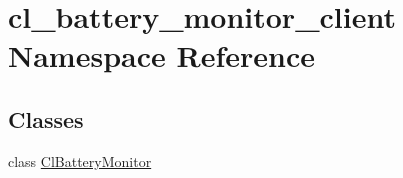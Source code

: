 \hypertarget{namespacecl__battery__monitor__client}{}\section{cl\+\_\+battery\+\_\+monitor\+\_\+client Namespace Reference}
\label{namespacecl__battery__monitor__client}
\subsection*{Classes}
\begin{DoxyCompactItemize}
\item 
class \hyperlink{classcl__battery__monitor__client_1_1ClBatteryMonitor}{Cl\+Battery\+Monitor}
\end{DoxyCompactItemize}

